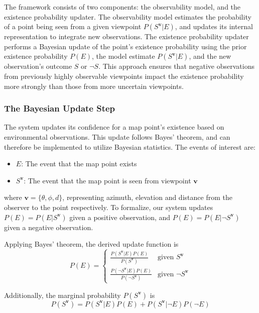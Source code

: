 The framework consists of two components: the observability model, and the existence probability updater. The observability model estimates the probability of a point being seen from a given viewpoint $P(S^{\boldsymbol{v}}|E)$, and updates its internal representation to integrate new observations. The existence probability updater performs a Bayesian update of the point's existence probability using the prior existence probability $P(E)$, the model estimate $P(S^{\boldsymbol{v}}|E)$, and the new observation's outcome $S$ or $\lnot S$. This approach ensures that negative observations from previously highly observable viewpoints impact the existence probability more strongly than those from more uncertain viewpoints.

\subsubsection{The Bayesian Update Step}

The system updates its confidence for a map point's existence based on environmental observations. This update follows Bayes' theorem, and can therefore be implemented to utilize Bayesian statistics. The events of interest are:
\begin{itemize}
    \item $E$: The event that the map point exists
    \item $S^{\boldsymbol{v}}$: The event that the map point is seen from viewpoint $\boldsymbol{v}$
\end{itemize}

where $\boldsymbol{v} = \{\theta,\phi,d\}$, representing azimuth, elevation and distance from the observer to the point respectively. To formalize, our system updates $P(E) = P(E|S^{\boldsymbol{v}})$ given a positive observation, and $P(E) = P(E|\neg S^{\boldsymbol{v}})$ given a negative observation.

Applying Bayes' theorem, the derived update function is
\[
    P(E) = \begin{cases}
        \frac{P(S^{\boldsymbol{v}}|E)P(E)}{P(S^{\boldsymbol{v}})}           & \text{given }S^{\boldsymbol{v}}      \\
        \frac{P(\neg S^{\boldsymbol{v}}|E)P(E)}{P(\neg S^{\boldsymbol{v}})} & \text{given }\neg S^{\boldsymbol{v}}
    \end{cases}
\]

Additionally, the marginal probability $P(S^{\boldsymbol{v}})$ is
$$
    P(S^{\boldsymbol{v}}) = P(S^{\boldsymbol{v}}|E)P(E) + P(S^{\boldsymbol{v}}|\neg E)P(\neg E)
$$

